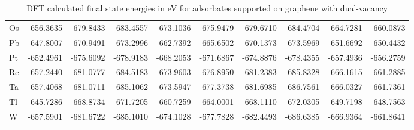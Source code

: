 \begin{table}[h]
{\begin{tabular}{*{10}{l}}
    Os & -656.3635 & -679.8433 & -683.4557 & -673.1036 & -675.9479 & -679.6710 & -684.4704 & -664.7281 & -660.0873 \\
    Pb & -647.8007 & -670.9491 & -673.2996 & -662.7392 & -665.6502 & -670.1373 & -673.5969 & -651.6692 & -650.4432 \\
    Pt & -652.4961 & -675.6092 & -678.9183 & -668.2053 & -671.6867 & -674.8876 & -678.4355 & -657.4936 & -656.2759 \\
    Re & -657.2440 & -681.0777 & -684.5183 & -673.9603 & -676.8950 & -681.2383 & -685.8328 & -666.1615 & -661.2885 \\
    Ta & -657.4068 & -681.0711 & -685.1062 & -673.5947 & -677.3738 & -681.6985 & -686.7561 & -666.0327 & -661.7361 \\
    Tl & -645.7286 & -668.8734 & -671.7205 & -660.7259 & -664.0001 & -668.1110 & -672.0305 & -649.7198 & -648.7563 \\
    W  & -657.5901 & -681.6722 & -685.1010 & -674.1028 & -677.7828 & -682.4493 & -686.6385 & -666.9364 & -661.8641 \\
    \hline
  \end{tabular}
  }
  \caption{DFT calculated final state energies in eV for adsorbates supported on graphene with dual-vacancy}
  \label{si_table6}
\end{table}



